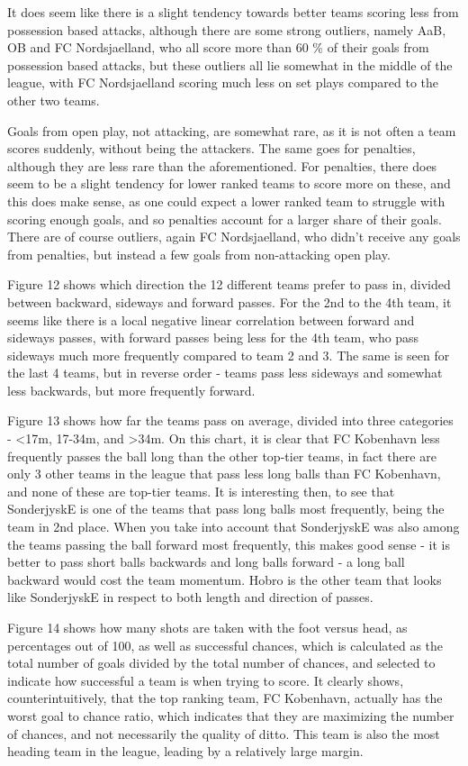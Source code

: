 \documentclass[Report.tex]{subfiles}
\begin{document}
It does seem like there is a slight tendency towards better teams scoring less
from possession based attacks, although there are some strong outliers, namely
AaB, OB and FC Nordsjaelland, who all score more than 60 \% of their
goals from possession based attacks, but these outliers all lie somewhat in the
middle of the league, with FC Nordsjaelland scoring much less on set plays
compared to the other two teams. 

Goals from open play, not attacking, are somewhat rare, as it is not often a
team scores suddenly, without being the attackers. The same goes for penalties,
although they are less rare than the aforementioned. For penalties, there does
seem to be a slight tendency for lower ranked teams to score more on these, and
this does make sense, as one could expect a lower ranked team to struggle with
scoring enough goals, and so penalties account for a larger share of their
goals. There are of course outliers, again FC Nordsjaelland, who didn't receive
any goals from penalties, but instead a few goals from non-attacking open play. 

Figure 12 shows which direction the 12 different teams prefer to pass in,
divided between backward, sideways and forward passes. For the 2nd to the 4th
team, it seems like there is a local negative linear correlation between forward
and sideways passes, with forward passes being less for the 4th team, who pass
sideways much more frequently compared to team 2 and 3. The same is seen for the
last 4 teams, but in reverse order - teams pass less sideways and somewhat less
backwards, but more frequently forward. 

Figure 13 shows how far the teams pass on average, divided into three
categories - <17m, 17-34m, and >34m. 
On this chart, it is clear that FC Kobenhavn less frequently passes the ball
long than the other top-tier teams, in fact there are only 3 other teams in the
league that pass less long balls than FC Kobenhavn, and none of these are
top-tier teams. It is interesting then, to see that SonderjyskE is one of the
teams that pass long balls most frequently, being the team in 2nd place. When
you take into account that SonderjyskE was also among the teams passing the ball
forward most frequently, this makes good sense - it is better to pass short
balls backwards and long balls forward - a long ball backward would cost the
team momentum. Hobro is the other team that looks like SonderjyskE in respect to
both length and direction of passes. 

Figure 14 shows how many shots are taken with the foot versus head, as
percentages out of 100, as well as successful chances, which is calculated as
the total number of goals divided by the total number of chances, and selected
to indicate how successful a team is when trying to score. 
It clearly shows, counterintuitively, that the top ranking team, FC Kobenhavn,
actually has the worst goal to chance ratio, which indicates that they are
maximizing the number of chances, and not necessarily the quality of ditto. This
team is also the most heading team in the league, leading by a relatively large
margin. 
\end{document}
